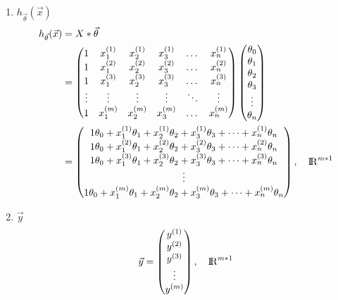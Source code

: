 \begin{enumerate}
\item $h_{\vec{\theta}}(\vec{x})$
\begin{equation}\begin{aligned}
	h_{\vec{\theta}}(\vec{x}) &= X * \vec{\theta} \\
	    & = \left(\begin{matrix}
			1 & x_1^{(1)} & x_2^{(1)} & x_3^{(1)} & \dots & x_n^{(1)} \\
			1 & x_1^{(2)} & x_2^{(2)} & x_3^{(2)} & \dots & x_n^{(2)} \\
			1 & x_1^{(3)} & x_2^{(3)} & x_3^{(3)} & \dots & x_n^{(3)} \\
			\vdots    & \vdots    & \vdots    & \vdots    & \ddots & \vdots   \\
			1 & x_1^{(m)} & x_2^{(m)} & x_3^{(m)} & \dots & x_n^{(m)} \\
		\end{matrix}\right)
		\left(\begin{matrix}
			\theta_0 \\ \theta_1 \\ \theta_2 \\ \theta_3 \\ \vdots \\ \theta_n \\
		\end{matrix}\right) \\
		& = \left(\begin{matrix}
			1\theta_0 + x_1^{(1)}\theta_1 + x_2^{(1)}\theta_2 + x_3^{(1)}\theta_3 + \dots + x_n^{(1)}\theta_n \\
			1\theta_0 + x_1^{(2)}\theta_1 + x_2^{(2)}\theta_2 + x_3^{(2)}\theta_3 + \dots + x_n^{(2)}\theta_n \\
			1\theta_0 + x_1^{(3)}\theta_1 + x_2^{(3)}\theta_2 + x_3^{(3)}\theta_3 + \dots + x_n^{(3)}\theta_n \\
			\vdots \\
			1\theta_0 + x_1^{(m)}\theta_1 + x_2^{(m)}\theta_2 + x_3^{(m)}\theta_3 + \dots + x_n^{(m)}\theta_n \\
		\end{matrix}\right), \quad {\rm I\!R}^{{m*1}}
\end{aligned}\end{equation}

\item $\vec{y}$
\begin{equation}
	\vec{y} = \left(\begin{matrix}
		y^{(1)} \\ y^{(2)} \\ y^{(3)} \\ \vdots \\ y^{(m)}
	\end{matrix}\right), \quad {\rm I\!R}^{{m*1}}
\end{equation}
\end{enumerate}

